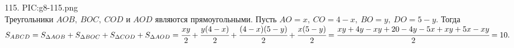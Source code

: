 115. {{PIC:g8-115.png}}\\
Треугольники $AOB,\ BOC,\ COD$ и $AOD$ являются прямоугольными. Пусть $AO=x,\ CO=4-x,\ BO=y,\ DO=5-y.$ Тогда $S_{ABCD}=S_{\Delta AOB}+S_{\Delta BOC}+S_{\Delta COD}+S_{\Delta AOD}=\cfrac{xy}{2}+\cfrac{y(4-x)}{2}+\cfrac{(4-x)(5-y)}{2}+\cfrac{x(5-y)}{2}=\cfrac{xy+4y-xy+20-4y-5x+xy+5x-xy}{2}=10.$\\
